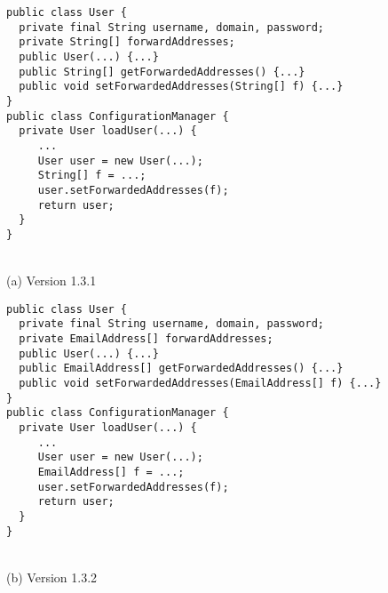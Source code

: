 \begin{figure}[p]
\BC \begin{minipage}{0.92\textwidth}
\begin{lstlisting}[frame=single]
public class User {
  private final String username, domain, password;
  private String[] forwardAddresses;
  public User(...) {...}
  public String[] getForwardedAddresses() {...}
  public void setForwardedAddresses(String[] f) {...}
}
public class ConfigurationManager {
  private User loadUser(...) {
     ...
     User user = new User(...);
     String[] f = ...;
     user.setForwardedAddresses(f);
     return user;
  }
}
\end{lstlisting}
\end{minipage} \\
(a) Version 1.3.1 \EC

\BC \begin{minipage}{0.92\textwidth}
\begin{lstlisting}[frame=single]
public class User {
  private final String username, domain, password;
  private EmailAddress[] forwardAddresses;
  public User(...) {...}
  public EmailAddress[] getForwardedAddresses() {...}
  public void setForwardedAddresses(EmailAddress[] f) {...}
}
public class ConfigurationManager {
  private User loadUser(...) {
     ...
     User user = new User(...);
     EmailAddress[] f = ...;
     user.setForwardedAddresses(f);
     return user;
  }
}
\end{lstlisting}
\end{minipage} \\
(b) Version 1.3.2 \EC
{}
\label{fig:jes-string-emailaddress-example}
\end{figure}
